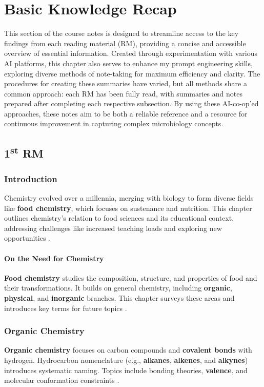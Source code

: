 \chapter{Basic Knowledge Recap}
\setlength{\headheight}{12.71342pt}
\addtolength{\topmargin}{-0.71342pt}

This section of the course notes is designed to streamline access to the key findings from each reading material (RM), providing a concise and accessible overview of essential information. Created through experimentation with various AI platforms, this chapter also serves to enhance my prompt engineering skills, exploring diverse methods of note-taking for maximum efficiency and clarity. The procedures for creating these summaries have varied, but all methods share a common approach: each RM has been fully read, with summaries and notes prepared after completing each respective subsection. By using these AI-co-op'ed approaches, these notes aim to be both a reliable reference and a resource for continuous improvement in capturing complex microbiology concepts.

\section{1\texorpdfstring{\textsuperscript{st}}{st} RM}
\subsection*{Introduction}
Chemistry evolved over a millennia, merging with biology to form diverse fields like \textbf{food chemistry}, which focuses on sustenance and nutrition. This chapter outlines chemistry's relation to food sciences and its educational context, addressing challenges like increased teaching loads and exploring new opportunities \cite*{BKR_01}.

\subsubsection*{On the Need for Chemistry}
\textbf{Food chemistry} studies the composition, structure, and properties of food and their transformations. It builds on general chemistry, including \textbf{organic}, \textbf{physical}, and \textbf{inorganic} branches. This chapter surveys these areas and introduces key terms for future topics \cite*{BKR_01}.

\subsection*{Organic Chemistry}
\textbf{Organic chemistry} focuses on carbon compounds and \textbf{covalent bonds} with hydrogen. Hydrocarbon nomenclature (e.g., \textbf{alkanes}, \textbf{alkenes}, and \textbf{alkynes}) introduces systematic naming. Topics include bonding theories, \textbf{valence}, and molecular conformation constraints \cite*{BKR_01}.

